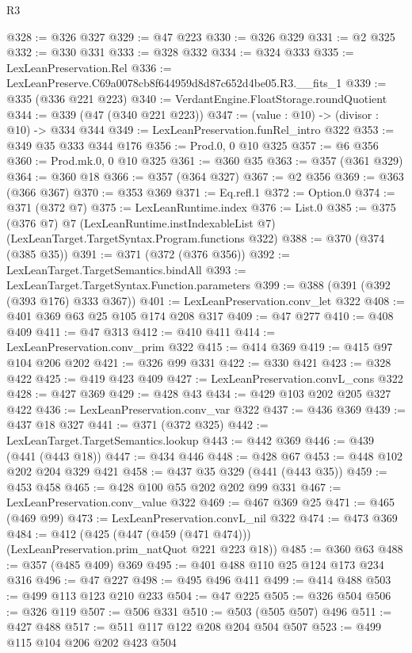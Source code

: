 \begin{lexlean}{R3}
\begin{coremodule}
@328 := @326 @327
@329 := @47 @223
@330 := @326 @329
@331 := @2 @325
@332 := @330 @331
@333 := @328 @332
@334 := @324 @333
@335 := LexLeanPreservation.Rel
@336 := LexLeanPreserve.C69a0078cb8f644959d8d87c652d4be05.R3.__fits_1
@339 := @335 (@336 @221 @223)
@340 := VerdantEngine.FloatStorage.roundQuotient
@344 := @339 (@47 (@340 @221 @223))
@347 := (value : @10) -> (divisor : @10) -> @334 @344
@349 := LexLeanPreservation.funRel_intro @322
@353 := @349 @35 @333 @344 @176
@356 := Prod.{0, 0} @10 @325
@357 := @6 @356
@360 := Prod.mk.{0, 0} @10 @325
@361 := @360 @35
@363 := @357 (@361 @329)
@364 := @360 @18
@366 := @357 (@364 @327)
@367 := @2 @356
@369 := @363 (@366 @367)
@370 := @353 @369
@371 := Eq.refl.{1}
@372 := Option.{0}
@374 := @371 (@372 @7)
@375 := LexLeanRuntime.index
@376 := List.{0}
@385 := @375
    (@376 @7)
    @7
    (LexLeanRuntime.instIndexableList @7)
    (LexLeanTarget.TargetSyntax.Program.functions @322)
@388 := @370 (@374 (@385 @35))
@391 := @371 (@372 (@376 @356))
@392 := LexLeanTarget.TargetSemantics.bindAll
@393 := LexLeanTarget.TargetSyntax.Function.parameters
@399 := @388 (@391 (@392 (@393 @176) @333 @367))
@401 := LexLeanPreservation.conv_let @322
@408 := @401 @369 @63 @25 @105 @174 @208 @317
@409 := @47 @277
@410 := @408 @409
@411 := @47 @313
@412 := @410 @411
@414 := LexLeanPreservation.conv_prim @322
@415 := @414 @369
@419 := @415 @97 @104 @206 @202
@421 := @326 @99 @331
@422 := @330 @421
@423 := @328 @422
@425 := @419 @423 @409
@427 := LexLeanPreservation.convL_cons @322
@428 := @427 @369
@429 := @428 @43
@434 := @429 @103 @202 @205 @327 @422
@436 := LexLeanPreservation.conv_var @322
@437 := @436 @369
@439 := @437 @18 @327
@441 := @371 (@372 @325)
@442 := LexLeanTarget.TargetSemantics.lookup
@443 := @442 @369
@446 := @439 (@441 (@443 @18))
@447 := @434 @446
@448 := @428 @67
@453 := @448 @102 @202 @204 @329 @421
@458 := @437 @35 @329 (@441 (@443 @35))
@459 := @453 @458
@465 := @428 @100 @55 @202 @202 @99 @331
@467 := LexLeanPreservation.conv_value @322
@469 := @467 @369 @25
@471 := @465 (@469 @99)
@473 := LexLeanPreservation.convL_nil @322
@474 := @473 @369
@484 := @412 (@425 (@447 (@459 (@471 @474))) (LexLeanPreservation.prim_natQuot @221 @223 @18))
@485 := @360 @63
@488 := @357 (@485 @409) @369
@495 := @401 @488 @110 @25 @124 @173 @234 @316
@496 := @47 @227
@498 := @495 @496 @411
@499 := @414 @488
@503 := @499 @113 @123 @210 @233
@504 := @47 @225
@505 := @326 @504
@506 := @326 @119
@507 := @506 @331
@510 := @503 (@505 @507) @496
@511 := @427 @488
@517 := @511 @117 @122 @208 @204 @504 @507
@523 := @499 @115 @104 @206 @202 @423 @504

\end{coremodule}
\end{lexlean}
